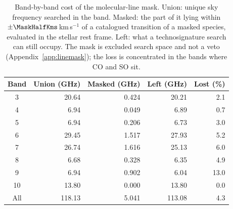 \begin{table}
\centering
\footnotesize
\setlength{\tabcolsep}{4pt}
\caption{Band-by-band cost of the molecular-line mask. Union: unique sky frequency searched in the band. Masked: the part of it lying within $\pm\MaskHalfKms$\,km\,s$^{-1}$ of a catalogued transition of a masked species, evaluated in the stellar rest frame. Left: what a technosignature search can still occupy. The mask is excluded search space and not a veto (Appendix~\ref{app:linemask}); the loss is concentrated in the bands where CO and SO sit.}
\label{tab:maskband}
\begin{tabular}{@{}crrrr@{}}
\hline
Band & Union (GHz) & Masked (GHz) & Left (GHz) & Lost (\%) \\
\hline
3 & 20.64 & 0.424 & 20.21 & 2.1 \\
4 & 6.94 & 0.049 & 6.89 & 0.7 \\
5 & 6.94 & 0.206 & 6.73 & 3.0 \\
6 & 29.45 & 1.517 & 27.93 & 5.2 \\
7 & 26.74 & 1.616 & 25.13 & 6.0 \\
8 & 6.68 & 0.328 & 6.35 & 4.9 \\
9 & 6.94 & 0.902 & 6.04 & 13.0 \\
10 & 13.80 & 0.000 & 13.80 & 0.0 \\
\hline
All & 118.13 & 5.041 & 113.08 & 4.3 \\
\hline
\end{tabular}
\end{table}
